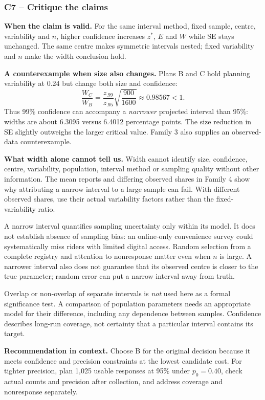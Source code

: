 \subsubsection*{C7 -- Critique the claims}\label{sol:c7-advanced-prop-b}
\textbf{When the claim is valid.} For the same interval method, fixed sample, centre, variability and $n$, higher confidence increases $z^*$, $E$ and $W$ while SE stays unchanged. The same centre makes symmetric intervals nested; fixed variability and $n$ make the width conclusion hold.

\textbf{A counterexample when size also changes.} Plans B and C hold planning variability at 0.24 but change both size and confidence:
\[\frac{W_C}{W_B}=\frac{z_{.99}}{z_{.95}}\sqrt{\frac{900}{1600}}\approx0.98567<1.\]
Thus 99\% confidence can accompany a \emph{narrower} projected interval than 95\%: widths are about 6.3095 versus 6.4012 percentage points. The size reduction in SE slightly outweighs the larger critical value. Family 3 also supplies an observed-data counterexample.

\textbf{What width alone cannot tell us.} Width cannot identify size, confidence, centre, variability, population, interval method or sampling quality without other information. The mean reports and differing observed shares in Family 4 show why attributing a narrow interval to a large sample can fail. With different observed shares, use their actual variability factors rather than the fixed-variability ratio.

A narrow interval quantifies sampling uncertainty only within its model. It does not establish absence of sampling bias: an online-only convenience survey could systematically miss riders with limited digital access. Random selection from a complete registry and attention to nonresponse matter even when $n$ is large. A narrower interval also does not guarantee that its observed centre is closer to the true parameter; random error can put a narrow interval away from truth.

Overlap or non-overlap of separate intervals is \emph{not} used here as a formal significance test. A comparison of population parameters needs an appropriate model for their difference, including any dependence between samples. Confidence describes long-run coverage, not certainty that a particular interval contains its target.

\textbf{Recommendation in context.} Choose B for the original decision because it meets confidence and precision constraints at the lowest candidate cost. For tighter precision, plan 1,025 usable responses at 95\% under $p_0=0.40$, check actual counts and precision after collection, and address coverage and nonresponse separately.

